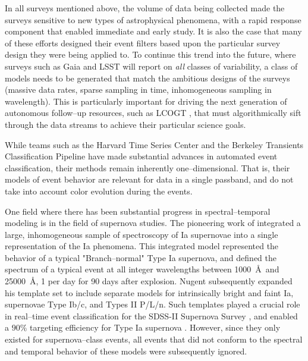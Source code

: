 

In all surveys mentioned above, the volume of data being collected made the
surveys sensitive to new types of astrophysical phenomena, with a rapid response
component that enabled immediate and early study.  It is also the case that many
of these efforts designed their event filters based upon the particular survey
design they were being applied to.  To continue this trend into the future,
where surveys such as Gaia \citep{X} and LSST \citep{X} will report on {\it all}
classes of variability, a class of models needs to be generated that match the
ambitious designs of the surveys (massive data rates, sparse sampling in time,
inhomogeneous sampling in wavelength).  This is particularly important for
driving the next generation of autonomous follow--up resources, such as LCOGT
\citep{2008AN....329..269H}, that must algorithmically sift through the data
streams to achieve their particular science goals.

 \smallskip

While teams such as the Harvard Time Series Center \citep{} and the Berkeley
Transients Classification Pipeline \citep{} have made substantial advances in
automated event classification, their methods remain inherently
one--dimensional. That is, their models of event behavior are relevant for data
in a single passband, and do not take into account color evolution during the
events.

One field where there has been substantial progress in spectral--temporal
modeling is in the field of supernova studies. The pioneering work of
\cite{2002PASP..114..803N} integrated a large, inhomogeneous sample of
spectroscopy of Ia supernovae into a single representation of the Ia phenomena.
This integrated model represented the behavior of a typical "Branch--normal"
Type Ia supernova, and defined the spectrum of a typical event at all integer
wavelengths between 1000~\AA~and 25000~\AA, 1 per day for 90 days after
explosion.  Nugent subsequently expanded his template set to include separate
models for intrinsically bright and faint Ia, supernovae Type Ib/c, and Types II
P/L/n. Such templates played a crucial role in real--time event classification
for the SDSS-II Supernova Survey \citep{2008AJ....135..338F}, and enabled a
$90\%$ targeting efficiency for Type Ia supernova \citep{2008AJ....135..348S}.
However, since they only existed for supernova--class events, all events that
did not conform to the spectral and temporal behavior of these models were
subsequently ignored.

